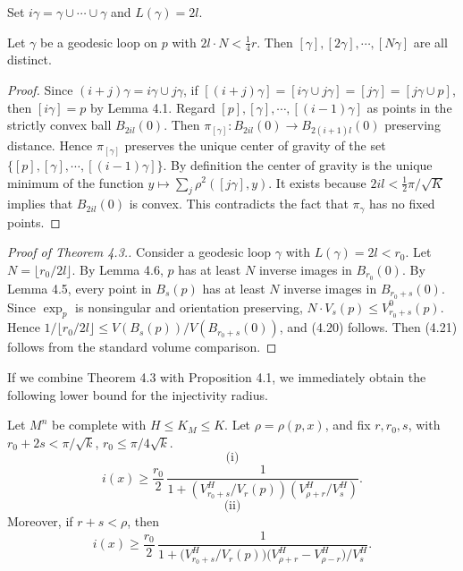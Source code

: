 Set $i\gamma=\gamma\cup \cdots \cup \gamma$ and $L(\gamma)=2l$.

\begin{lemma}
\label{lem:iterated-geodesic-loops}

Let $\gamma$ be a geodesic loop on $p$ with $2l \cdot N < \frac14 r$. Then
$[\gamma], [2\gamma], \cdots, [N\gamma]$ are all distinct.
\end{lemma}

\begin{proof}
Since $(i+j)\gamma=i\gamma \cup j\gamma$, if
$[(i+j)\gamma]=[i\gamma \cup j\gamma]=[j\gamma]=[j\gamma \cup p]$, then
$[i\gamma]=p$ by Lemma 4.1. Regard $[p],[\gamma],\cdots,[(i-1)\gamma]$ as points
in the strictly convex ball $B_{2il}(0)$. Then $\pi_{[\gamma]}: B_{2il}(0) \to
B_{2(i+1)l}(0)$ preserving distance. Hence $\pi_{[\gamma]}$ preserves the unique
center of gravity of the set $\{[p],[\gamma],\cdots,[(i-1)\gamma]\}$. By
definition the center of gravity is the unique minimum of the function
$y \mapsto \sum_j \rho^2([j\gamma],y)$. It exists because $2il < \frac12
\pi/\sqrt{K}$ implies that $B_{2il}(0)$ is convex. This contradicts the fact that
$\pi_\gamma$ has no fixed points.
\end{proof}

\begin{proof}[Proof of Theorem 4.3.]
Consider a geodesic loop $\gamma$ with
$L(\gamma)=2l<r_0$. Let $N=\lfloor r_0/2l \rfloor$. By Lemma 4.6, $p$ has at
least $N$ inverse images in $B_{r_0}(0)$. By Lemma 4.5, every point in
$B_s(p)$ has at least $N$ inverse images in $B_{r_0+s}(0)$. Since $\exp_p$ is
nonsingular and orientation preserving, $N \cdot V_s(p) \le V^0_{r_0+s}(p)$.
Hence $1/\lfloor r_0/2l \rfloor \le V(B_s(p))/V(B_{r_0+s}(0))$, and (4.20)
follows. Then (4.21) follows from the standard volume comparison.
\end{proof}

If we combine Theorem 4.3 with Proposition 4.1, we immediately obtain the
following lower bound for the injectivity radius.

\begin{theorem}
\label{thm:injectivity-radius-relative-volume}

Let $M^n$ be complete with $H \le K_M \le K$.
Let $\rho=\rho(p,x)$, and fix $r, r_0, s$, with $r_0 + 2s < \pi/\sqrt{k}$,
$r_0 \le \pi/4\sqrt{k}$.
\[
\text{(i)}
\]
\begin{equation}
\tag{4.23}
i(x) \ge \frac{r_0}{2}\,\frac{1}{1+\left(V^H_{r_0+s}/V_r(p)\right)\left(V^H_{\rho+r}/V^H_s\right)}.
\end{equation}
\[
\text{(ii)}
\]
Moreover, if $r+s<\rho$, then
\begin{equation}
\tag{4.24}
i(x)\ge \frac{r_0}{2}\,\frac{1}{1+\bigl(V^{H}_{r_0+s}/V_r(p)\bigr)\bigl(V^{H}_{\rho+r}-V^{H}_{\rho-r}\bigr)/V^{H}_s}.
\end{equation}
\end{theorem}

